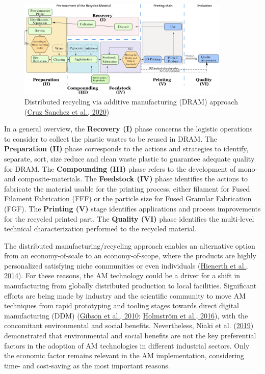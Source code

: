 \documentclass[
  11pt,
]{article}
\begin{document}
\begin{figure}[H]

{\centering \includegraphics[width=0.9\textwidth,height=\textheight]{figures/DRAM-10.png}

}

\caption{\label{fig-dram}Distributed recycling via additive
manufacturing (DRAM) approach
(\protect\hyperlink{ref-CruzSanchez2020}{Cruz Sanchez et al., 2020})}

\end{figure}

In a general overview, the \textbf{Recovery (I)} phase concerns the
logistic operations to consider to collect the plastic wastes to be
reused in DRAM. The \textbf{Preparation (II)} phase corresponds to the
actions and strategies to identify, separate, sort, size reduce and
clean waste plastic to guarantee adequate quality for DRAM. The
\textbf{Compounding (III)} phase refers to the development of mono- and
composite-materials. The \textbf{Feedstock (IV)} phase identifies the
actions to fabricate the material usable for the printing process,
either filament for Fused Filament Fabrication (FFF) or the particle
size for Fused Granular Fabrication (FGF). The \textbf{Printing (V)}
stage identifies applications and process improvements for the recycled
printed part. The \textbf{Quality (VI)} phase identifies the multi-level
technical characterization performed to the recycled material.

The distributed manufacturing/recycling approach enables an alternative
option from an economy-of-scale to an economy-of-scope, where the
products are highly personalized satisfying niche communities or even
individuals (\protect\hyperlink{ref-Hienerth2014}{Hienerth et al.,
2014}). For these reasons, the AM technology could be a driver for a
shift in manufacturing from globally distributed production to local
facilities. Significant efforts are being made by industry and the
scientific community to move AM techniques from rapid prototyping and
tooling stages towards direct digital manufacturing (DDM)
(\protect\hyperlink{ref-Mueller2012}{Gibson et al., 2010};
\protect\hyperlink{ref-Holmstrom2016}{Holmström et al., 2016}), with the
concomitant environmental and social benefits. Nevertheless, Niaki et
al. (\protect\hyperlink{ref-Niaki2019}{2019}) demonstrated that
environmental and social benefits are not the key preferential factors
in the adoption of AM technologies in different industrial sectors. Only
the economic factor remains relevant in the AM implementation,
considering time- and cost-saving as the most important reasons.
\end{document}
